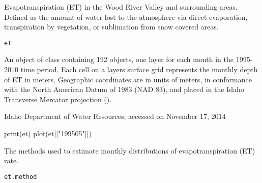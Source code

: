 \documentclass[letterpaper]{book}
\begin{document}
%
\begin{Description}\relax
Evapotranspiration (ET) in the Wood River Valley and surrounding areas.
Defined as the amount of water lost to the atmosphere via direct evaporation, transpiration by vegetation, or sublimation from snow covered areas.
\end{Description}
%
\begin{Usage}
\begin{verbatim}
et
\end{verbatim}
\end{Usage}
%
\begin{Format}
An object of  class containing 192  objects, one layer for each month in the 1995-2010 time period.
Each cell on a layers surface grid represents the monthly depth of ET in meters.
Geographic coordinates are in units of meters, in conformance with the North American Datum of 1983 (NAD 83), and placed in the
Idaho Transverse Mercator projection ().
\end{Format}
%
\begin{Source}\relax
Idaho Department of Water Resources, accessed on November 17, 2014
\end{Source}
%
\begin{SeeAlso}\relax
{}
\end{SeeAlso}
%
\begin{Examples}
\begin{ExampleCode}
print(et)
plot(et[["199505"]])
\end{ExampleCode}
\end{Examples}
%
\begin{Description}\relax
The methods used to estimate monthly distributions of evapotranspiration (ET) rate.
\end{Description}
%
\begin{Usage}
\begin{verbatim}
et.method
\end{verbatim}
\end{Usage}
%
\end{document}
